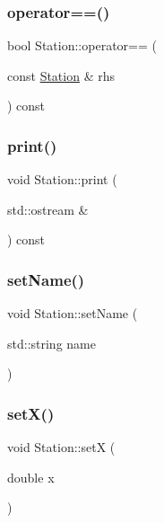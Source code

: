 \mbox{\label{class_station_adae415f0267986c0056899ff4104cd5e}} 
\subsubsection{\texorpdfstring{operator==()}{operator==()}}
{\footnotesize\ttfamily bool Station\+::operator== (\begin{DoxyParamCaption}\item[{const \mbox{\hyperlink{class_station}{Station}} \&}]{rhs }\end{DoxyParamCaption}) const}

\mbox{\label{class_station_a1dfee264d3f636388b032675acb1302a}} 
\subsubsection{\texorpdfstring{print()}{print()}}
{\footnotesize\ttfamily void Station\+::print (\begin{DoxyParamCaption}\item[{std\+::ostream \&}]{ }\end{DoxyParamCaption}) const}

\mbox{\label{class_station_ad06d1756f0034a3f73ee1fe2993f87b9}} 
\subsubsection{\texorpdfstring{set\+Name()}{setName()}}
{\footnotesize\ttfamily void Station\+::set\+Name (\begin{DoxyParamCaption}\item[{std\+::string}]{name }\end{DoxyParamCaption})}

\mbox{\label{class_station_ac9a83dadcfdcb36f477fed3c4586ff13}} 
\subsubsection{\texorpdfstring{set\+X()}{setX()}}
{\footnotesize\ttfamily void Station\+::setX (\begin{DoxyParamCaption}\item[{double}]{x }\end{DoxyParamCaption})}

